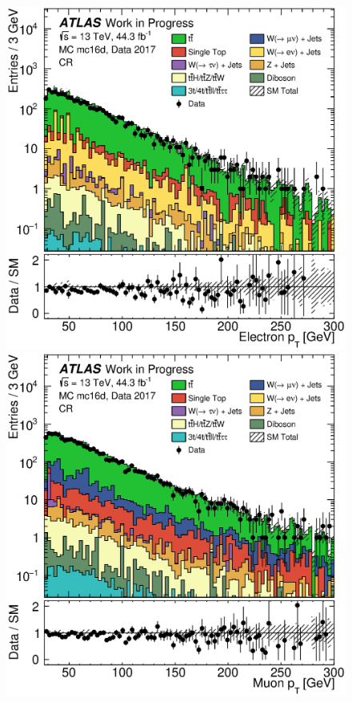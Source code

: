\begin{figure}[t]
    \vspace{-1.4em}
    \centering
    \setlength{\individualPlotWidth}{0.434\fulllinewidth}
    \begin{minipage}{0.91\fulllinewidth}
        \raggedright
        \includegraphics[width=\individualPlotWidth]{Assets/Plots/withData/h_stack_mc16d_data17_el_pt.eps}
        \hspace{1em}
        \includegraphics[width=\individualPlotWidth]{Assets/Plots/withData/h_stack_mc16d_data17_mu_pt.eps}


\end{minipage}
\end{figure}
